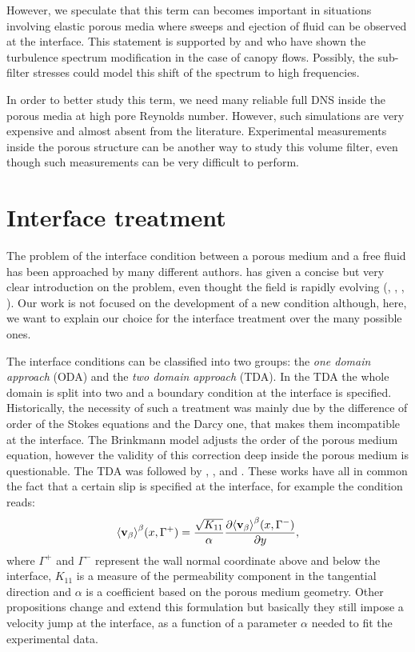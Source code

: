 However, we speculate that this term can becomes important in situations involving elastic porous media where sweeps and ejection of fluid can be observed at the interface.
This statement is supported by \citet{finnigan2000turbulence} and \citet{de2008effects} who have shown the turbulence spectrum modification in the case of canopy flows. Possibly, the sub-filter stresses could model this shift of the spectrum to high frequencies.

In order to better study this term, we need many reliable full DNS inside the porous media at high pore Reynolds number. However, such simulations are very expensive and almost absent from the literature.
Experimental measurements inside the porous structure can be another way to study this volume filter, even though such measurements can be very difficult to perform.

\section{Interface treatment}
\label{ch:interface}

The problem of the interface condition between a porous medium and a free fluid has been approached by many different authors. \citet{ehrhardt2010interface} has given a concise but very clear introduction on the problem, even thought the field is rapidly evolving (\citet{minale2014momentum}, \citet{angot2017asymptotic}, \citet{lacis2017framework}, \citet{zampogna2017new}).
Our work is not focused on the development of a new condition although, here, we want to explain our choice for the interface treatment over the many possible ones.

The interface conditions can be classified into two groups: the \textit{one domain approach} (ODA) and the \textit{two domain approach} (TDA).
In the TDA the whole domain is split into two and a boundary condition at the interface is specified. Historically, the necessity of such a treatment was mainly due by the difference of order of the Stokes equations and the Darcy one, that makes them incompatible at the interface.
The Brinkmann model adjusts the order of the porous medium equation, however the validity of this correction deep inside the porous medium is questionable.
The TDA was followed by \citet{beaver}, \citet{mikelic2000interface}, \citet{ochoa1995momentum} and \citet{le2006interfacial}.
These works have all in common the fact that a certain slip is specified at the interface, for example the \citet{beaver} condition reads:
$$
{\left< \textbf{v}_{\beta} \right>}^{\beta}(x,\Gamma^+) = \dfrac{\sqrt{K_{11}}}{\alpha} \dfrac{\partial {\left< \textbf{v}_{\beta}\right>}^{\beta}(x, \Gamma^-)}{\partial y},
$$
where $\Gamma^+$ and $\Gamma^-$ represent the wall normal coordinate above and below the interface, $K_{11}$ is a measure of the permeability component in the tangential direction and $\alpha$ is a coefficient based on the porous medium geometry.
Other propositions change and extend this formulation but basically they still impose a velocity jump at the interface, as a function of a parameter $\alpha$ needed to fit the experimental data.

